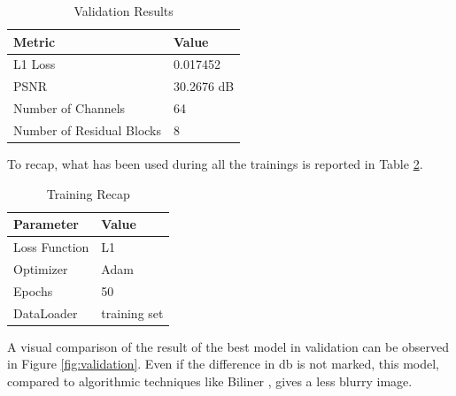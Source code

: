 \documentclass[../report.tex]{subfiles}
\begin{document}
\begin{table}[]
	\centering
	\caption{Validation Results}
	\begin{tabular}{@{}ll@{}}
		\toprule
		\textbf{Metric}            & \textbf{Value} \\ \midrule
		L1 Loss                    & 0.017452 \\ 
		PSNR                       & 30.2676 dB \\ 
		Number of Channels         & 64 \\ 
		Number of Residual Blocks  & 8 \\ 
		\bottomrule
	\end{tabular}
	\label{tab:validation_results}
\end{table}
To recap, what has been used during all the trainings is reported in Table \ref{tab:training_recap}.
\begin{table}[]
	\centering
	\caption{Training Recap}
	\begin{tabular}{@{}ll@{}}
		\toprule
		\textbf{Parameter}       & \textbf{Value} \\ \midrule
		Loss Function            & L1 \\ 
		Optimizer                & Adam \\ 
		Epochs                   & 50 \\ 
		DataLoader      & training set\\
		\bottomrule
	\end{tabular}
	\label{tab:training_recap}
\end{table}
A visual comparison of the result of the best model in validation can be observed in Figure \ref{fig:validation}. Even if the difference in db is not marked, this model, compared to algorithmic techniques like Biliner , gives a less blurry image. 
\end{document}
